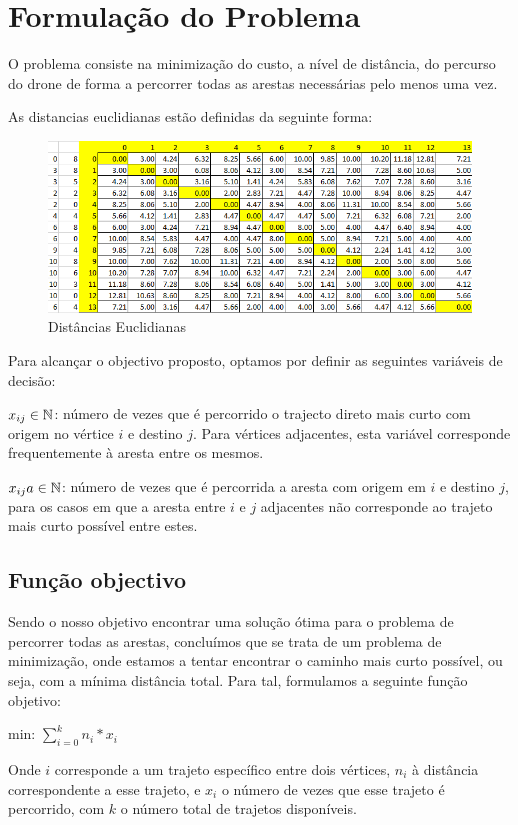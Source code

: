 \section{Formulação do Problema}


O problema consiste na minimização do custo, a nível de distância, do percurso do drone de forma a percorrer todas as arestas necessárias pelo menos uma vez. 

As distancias euclidianas estão definidas da seguinte forma:
\begin{figure}[h!]
\centering
\includegraphics[width=.85\textwidth]{images/main/distancias.png}
\caption{Distâncias Euclidianas}
\end{figure}

Para alcançar o objectivo proposto, optamos por definir as seguintes variáveis de decisão:

$x_{ij} \in \mathbb{N}$: número de vezes que é percorrido o trajecto direto mais curto com origem no vértice $i$ e destino $j$. Para vértices adjacentes, esta variável corresponde frequentemente à aresta entre os mesmos.

$x_{ij}a \in \mathbb{N}$: número de vezes que é percorrida a aresta com origem em $i$ e destino $j$, para os casos em que a aresta entre $i$ e $j$ adjacentes não corresponde ao trajeto mais curto possível entre estes.

\subsection{Função objectivo}



Sendo o nosso objetivo encontrar uma solução ótima para o problema de percorrer todas as arestas, concluímos que se trata de um problema de minimização, onde estamos a tentar encontrar o caminho mais curto possível, ou seja, com a mínima distância total. Para tal, formulamos a seguinte função objetivo:

min: $\sum_{i=0}^{k} n_{i} *x_{i}$

Onde $i$ corresponde a um trajeto específico entre dois vértices, $n_i$ à distância correspondente a esse trajeto, e $x_{i}$ o número de vezes que esse trajeto é percorrido, com $k$ o número total de trajetos disponíveis.

